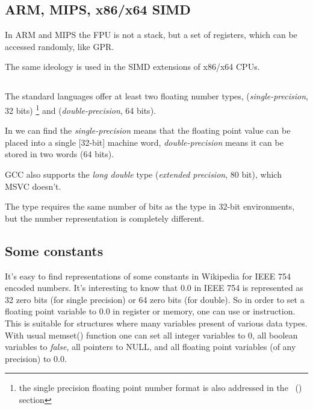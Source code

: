 \subsection{ARM, MIPS, x86/x64 SIMD}

In ARM and MIPS the FPU is not a stack, but a set of registers, which can be accessed randomly, like \ac{GPR}.

The same ideology is used in the SIMD extensions of x86/x64 CPUs.

\subsection{\CCpp}


The standard \CCpp languages offer at least two floating number types, \Tfloat (\emph{single-precision}, 32 bits)
\footnote{the single precision floating point number format is also addressed in 
the \emph{\WorkingWithFloatAsWithStructSubSubSectionName}~() section}
and \Tdouble (\emph{double-precision}, 64 bits).

In  we can find the \emph{single-precision} means that the floating point value can be placed into a single
[32-bit] machine word, \emph{double-precision} means it can be stored in two words (64 bits).


GCC also supports the \emph{long double} type (\emph{extended precision}, 80 bit), which MSVC doesn't.

The \Tfloat type requires the same number of bits as the \Tint type in 32-bit environments, 
but the number representation is completely different.





\subsection{Some constants}

It's easy to find representations of some constants in Wikipedia for IEEE 754 encoded numbers.
It's interesting to know that 0.0 in IEEE 754 is represented as 32 zero bits (for single precision) or 64 zero bits
(for double).
So in order to set a floating point variable to 0.0 in register or memory, one can use \MOV or  instruction.
This is suitable for structures where many variables present of various data types.
With usual memset() function one can set all integer variables to 0, all boolean variables to \emph{false}, all pointers
to NULL, and all floating point variables (of any precision) to 0.0.

